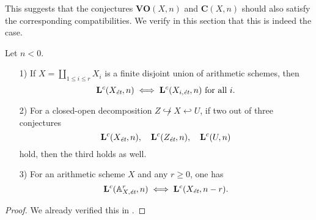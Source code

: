 \documentclass{article}
\numberwithin{equation}{section}
\begin{document}
This suggests that the conjectures $\mathbf{VO} (X,n)$ and $\mathbf{C} (X,n)$
should also satisfy the corresponding compatibilities. We verify in this section
that this is indeed the case.

\begin{lemma}
  \label{lemma:compatibility-of-Lc(X,n)}
  Let $n < 0$.

  \begin{enumerate}
  \item[1)] If $X = \coprod_{1 \le i \le r} X_i$ is a finite disjoint union of
    arithmetic schemes, then
    $$\mathbf{L}^c (X_\et,n) \iff \mathbf{L}^c (X_{i,\et},n)\text{ for all }i.$$

  \item[2)] For a closed-open decomposition
    $Z \not\hookrightarrow X \hookleftarrow U$, if two out of three conjectures
    \[ \mathbf{L}^c (X_\et,n), \quad
      \mathbf{L}^c (Z_\et,n), \quad
      \mathbf{L}^c (U,n) \]
    hold, then the third holds as well.

  \item[3)] For an arithmetic scheme $X$ and any $r \ge 0$, one has
    $$\mathbf{L}^c (\AA^r_{X,\et}, n) \iff \mathbf{L}^c (X_\et, n-r).$$
  \end{enumerate}

  \begin{proof}
    We already verified this in \cite[Lemma~8.9]{Beshenov-Weil-etale-1}.
  \end{proof}
\end{lemma}
\end{document}
